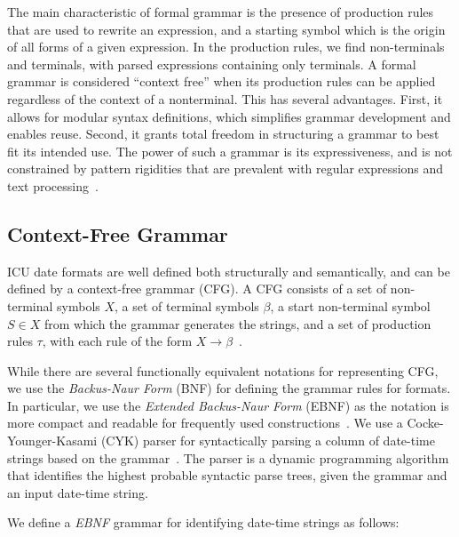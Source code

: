 The main characteristic of formal grammar is the presence of production rules that are used to rewrite an expression, and a starting symbol which is the origin of all forms of a given expression. In the production rules, we find non-terminals and terminals, with parsed expressions containing only terminals. A formal grammar is considered ``context free'' when its production rules can be applied regardless of the context of a nonterminal. This has several advantages. First, it allows for modular syntax definitions, which simplifies grammar development and enables reuse. Second, it grants total freedom
in structuring a grammar to best fit its intended use. The power of such a grammar is its expressiveness, and is not constrained by pattern rigidities that are prevalent with regular expressions and text processing~\cite{Grune:1990}.


\subsection{Context-Free Grammar}
ICU date formats are well defined both structurally and semantically, and can be defined by a context-free grammar (CFG). A CFG consists of a set of non-terminal symbols $X$, a set of terminal symbols $\beta$, a start non-terminal symbol $S \in X$ from which the grammar generates the strings, and a set of production rules $\tau$, with each rule of the form $X \rightarrow \beta$~\cite{Hopcroft:1990}. 

While there are several functionally equivalent notations for representing CFG, we use the \textit{Backus-Naur Form} (BNF) for defining the grammar rules for \dateparse formats. In particular, we use the \textit{Extended Backus-Naur Form} (EBNF) as the notation is more compact and readable for frequently used constructions~\cite{Grune:1990}. We use a Cocke-Younger-Kasami (CYK) parser for syntactically parsing a column of date-time strings based on the grammar~\cite{Cocke:1969,Younger67,Kasami:1965}. The parser is a dynamic programming algorithm that identifies the highest probable syntactic parse trees, given the grammar and an input date-time string.


We define a \textit{EBNF} grammar for identifying date-time strings as follows:

